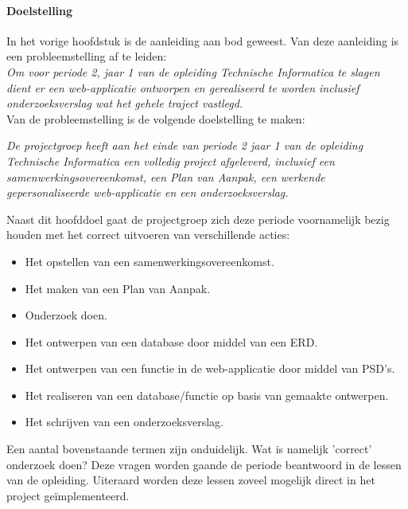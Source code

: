 \documentclass[11pt]{article}
\begin{document}
	\paragraph{Doelstelling}
	\begin{flushleft}
		In het vorige hoofdstuk is de aanleiding aan bod geweest. Van deze aanleiding is een probleemstelling af te leiden:\\
		\vspace{2mm}
		\textit{Om voor periode 2, jaar 1 van de opleiding Technische Informatica te slagen dient er een web-applicatie ontworpen en gerealiseerd te worden inclusief onderzoeksverslag wat
			het gehele traject vastlegd. }\vspace{2mm} \\
		
		Van de probleemstelling is de volgende doelstelling te maken:
		
		\vspace{2mm}
		\textit{De projectgroep heeft aan het einde van periode 2 jaar 1 van de opleiding Technische Informatica een volledig project afgeleverd, inclusief een samenwerkingsovereenkomst, een Plan van Aanpak, een werkende gepersonaliseerde web-applicatie en een onderzoeksverslag.}\vspace{2mm}
		
		
		Naast dit hoofddoel gaat de projectgroep zich deze periode voornamelijk bezig houden met het correct uitvoeren van verschillende acties:
		\begin{itemize}
			\item Het opstellen van een samenwerkingsovereenkomst.
			\item Het maken van een Plan van Aanpak.
			\item Onderzoek doen.
			\item Het ontwerpen van een database door middel van een ERD.
			\item Het ontwerpen van een functie in de web-applicatie door middel van PSD's.
			\item Het realiseren van een database/functie op basis van gemaakte ontwerpen.
			\item Het schrijven van een onderzoeksverslag.
		\end{itemize}
	\end{flushleft}
	
	\begin{flushleft}
		Een aantal bovenstaande termen zijn onduidelijk. Wat is namelijk 'correct' onderzoek doen? Deze vragen worden gaande de periode beantwoord in de lessen van de opleiding.
		Uiteraard worden deze lessen zoveel mogelijk direct in het project geïmplementeerd.
	\end{flushleft}
\end{document}
